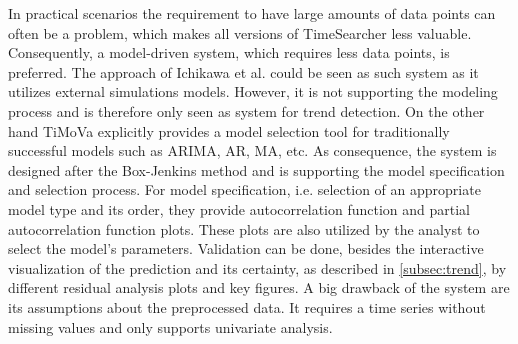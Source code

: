 \documentclass[electronic]{vgtc}             %
\begin{document}
In practical scenarios the requirement to have large amounts of data points can often be a problem, which makes all versions of TimeSearcher \cite{Hochheiser:2004, buono:2005, buono:2007} less valuable.
Consequently, a model-driven system, which requires less data points, is preferred.
The approach of Ichikawa et al. \cite{ichikawa:2002} could be seen as such system as it utilizes external simulations models.
However, it is not supporting the modeling process and is therefore only seen as system for trend detection.
On the other hand TiMoVa \cite{boegl:2013} explicitly provides a model selection tool for traditionally successful models such as ARIMA, AR, MA, etc.
As consequence, the system is designed after the Box-Jenkins method and is supporting the model specification and selection process.
For model specification, i.e. selection of an appropriate model type and its order, they provide autocorrelation function and partial autocorrelation function plots.
These plots are also utilized by the analyst to select the model's parameters.
Validation can be done, besides the interactive visualization of the prediction and its certainty, as described in \autoref{subsec:trend}, by different residual analysis plots and key figures.
A big drawback of the system are its assumptions about the preprocessed data. 
It requires a time series without missing values and only supports univariate analysis.
\end{document}
